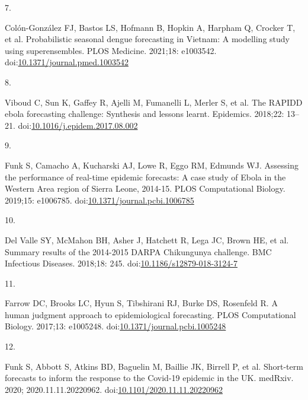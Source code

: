 \documentclass[10pt,letterpaper]{article}
\newlength{\cslhangindent}
\newlength{\csllabelwidth}
\newlength{\cslentryspacingunit} %
\newenvironment{CSLReferences}[2] %
 {%
  \setlength{\parindent}{0pt}
  \ifodd #1
  \let\oldpar\par
  \def\par{\hangindent=\cslhangindent\oldpar}
  \fi
  \setlength{\parskip}{#2\cslentryspacingunit}
 }%
 {}
\newcommand{\CSLLeftMargin}[1]{\parbox[t]{\csllabelwidth}{#1}}
\newcommand{\CSLRightInline}[1]{\parbox[t]{\linewidth - \csllabelwidth}{#1}\break}
\begin{document}
\begin{CSLReferences}{0}{0}
\leavevmode{}%
\CSLLeftMargin{7. }%
\CSLRightInline{Colón-González FJ, Bastos LS, Hofmann B, Hopkin A,
Harpham Q, Crocker T, et al. Probabilistic seasonal dengue forecasting
in {Vietnam}: {A} modelling study using superensembles. PLOS Medicine.
2021;18: e1003542.
doi:\href{https://doi.org/10.1371/journal.pmed.1003542}{10.1371/journal.pmed.1003542}}

\leavevmode{}%
\CSLLeftMargin{8. }%
\CSLRightInline{Viboud C, Sun K, Gaffey R, Ajelli M, Fumanelli L, Merler
S, et al. The {RAPIDD} ebola forecasting challenge: {Synthesis} and
lessons learnt. Epidemics. 2018;22: 13--21.
doi:\href{https://doi.org/10.1016/j.epidem.2017.08.002}{10.1016/j.epidem.2017.08.002}}

\leavevmode{}%
\CSLLeftMargin{9. }%
\CSLRightInline{Funk S, Camacho A, Kucharski AJ, Lowe R, Eggo RM,
Edmunds WJ. Assessing the performance of real-time epidemic forecasts:
{A} case study of {Ebola} in the {Western Area} region of {Sierra
Leone}, 2014-15. PLOS Computational Biology. 2019;15: e1006785.
doi:\href{https://doi.org/10.1371/journal.pcbi.1006785}{10.1371/journal.pcbi.1006785}}

\leavevmode{}%
\CSLLeftMargin{10. }%
\CSLRightInline{Del Valle SY, McMahon BH, Asher J, Hatchett R, Lega JC,
Brown HE, et al. Summary results of the 2014-2015 {DARPA Chikungunya}
challenge. BMC Infectious Diseases. 2018;18: 245.
doi:\href{https://doi.org/10.1186/s12879-018-3124-7}{10.1186/s12879-018-3124-7}}

\leavevmode{}%
\CSLLeftMargin{11. }%
\CSLRightInline{Farrow DC, Brooks LC, Hyun S, Tibshirani RJ, Burke DS,
Rosenfeld R. A human judgment approach to epidemiological forecasting.
PLOS Computational Biology. 2017;13: e1005248.
doi:\href{https://doi.org/10.1371/journal.pcbi.1005248}{10.1371/journal.pcbi.1005248}}

\leavevmode{}%
\CSLLeftMargin{12. }%
\CSLRightInline{Funk S, Abbott S, Atkins BD, Baguelin M, Baillie JK,
Birrell P, et al. Short-term forecasts to inform the response to the
{Covid-19} epidemic in the {UK}. medRxiv. 2020; 2020.11.11.20220962.
doi:\href{https://doi.org/10.1101/2020.11.11.20220962}{10.1101/2020.11.11.20220962}}


\end{CSLReferences}
\end{document}
